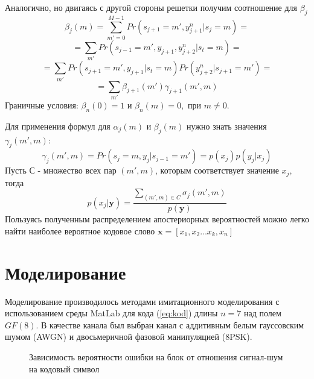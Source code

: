 \documentclass{ITaSconf}
\begin{document}
	Аналогично, но двигаясь с другой стороны решетки получим соотношение для $\beta_j$
$$\beta_j(m)=\sum\limits_{m'=0}^{M-1}Pr(s_{j+1}=m',y_{j+1}^n|s_j=m)=$$$$=\sum\limits_{m'}Pr(s_{j-1}=m',y_{j+1},y_{j+2}^n|s_t=m)=$$$$=\sum\limits_{m'}Pr(s_{j+1}=m',y_{j+1}|s_t=m)Pr(y_{j+2}^n|s_{j+1}=m')=$$$$=\sum\limits_{m'}\beta_{j+1}(m')\gamma_{j+1}(m',m)$$
Граничные условия: $ \beta_n(0)=1$ и $\beta_n(m)=0,$ при $m\neq0$.

Для применения формул для $\alpha_j(m)$ и $\beta_j(m)$ нужно знать значения $\gamma_j(m',m)$:
$$\gamma_j(m',m)=Pr(s_j=m,y_j|s_{j-1}=m')=p(x_j)p(y_j|x_j)$$ 
Пусть С - множество всех пар $(m',m)$, которым соответствует значение $x_j$, тогда 
$$p(x_j|\mathbold{y}) = \frac{\sum_{(m',m)\in C}\sigma_j(m',m)}{p(\mathbold{y})}$$ 
Пользуясь полученным распределением апостериорных вероятностей можно легко найти наиболее вероятное кодовое слово $\mathbold{x}=[x_1, x_2 \dots x_k, x_n]$

\section{Моделирование}
\label{sec:model}

Моделирование производилось методами имитационного моделирования с использованием среды MatLab для кода (\ref{eq:kod}) длины $n = 7$ над полем $GF(8)$. В качестве канала был выбран канал с аддитивным белым гауссовским шумом (AWGN) и двосьмеричной фазовой манипуляцией (8PSK). 

\begin{figure} [h]
\caption{Зависимость вероятности ошибки на блок от отношения сигнал-шум на кодовый символ}
\label{fig:block}
\end{figure}
\end{document}
